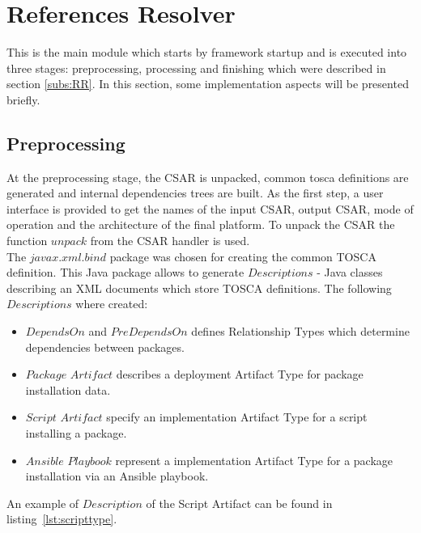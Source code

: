 \section{References Resolver}
This is the main module which starts by framework startup and is executed into three stages: preprocessing, processing and finishing which were described in section \ref{subs:RR}. 
In this section, some implementation aspects will be presented briefly.

\subsection*{Preprocessing}
At the preprocessing stage, the CSAR is unpacked, common \gls{tosca} definitions are generated and internal dependencies trees are built. 
%
As the first step, a user interface is provided to get the names of the input CSAR, output CSAR, mode of operation and the architecture of the final platform.
To unpack the CSAR the function $unpack$ from the CSAR handler is used.\\
%
The $javax$.$xml$.$bind$ package was chosen for creating the common TOSCA definition. 
This Java package allows to generate $Descriptions$ - Java classes describing an XML documents which store TOSCA definitions. 
The following $Descriptions$ where created:
\begin{itemize}
	\item $DependsOn$ and $PreDependsOn$ defines Relationship Types which determine dependencies %
	  between packages.%
	\item $Package$ $Artifact$ describes a deployment Artifact Type for package installation data.
	\item $Script$ $Artifact$ specify an implementation Artifact Type for a script installing a package.
	\item $Ansible$ $Playbook$ represent a implementation Artifact Type for a package installation via an Ansible playbook.
\end{itemize}
An example of $Description$ of the Script Artifact can be found in listing~\ref{lst:scripttype}.
